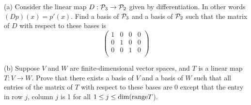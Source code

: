 \begin{question}

\normalfont
(a) Consider the linear map $D: \P_3 \to \P_2$ given by differentiation. In other words $(Dp)(x) = p'(x)$. Find a basis of $\P_3$ and a basis of $\P_2$ such that the matrix of $D$ with respect to these bases is 
\[
\left( \begin{array}{rrrr}
1 & 0 & 0 & 0 \\
0 & 1 & 0 & 0 \\
0 & 0 & 1 & 0 \\
\end{array}\right)
\]


\vspace{.4cm}

\noindent (b) Suppose $V$ and $W$ are finite-dimensional vector spaces, and $T$ is a linear map $T: V \to W$. Prove that there exists a basis of $V$ and a basis of $W$ such that all entries of the matrix of $T$ with respect to these bases are 0 except that the entry in row $j$, column $j$ is 1 for all $1\leq j \leq \dim (\textup{range} T$). 

\end{question}
